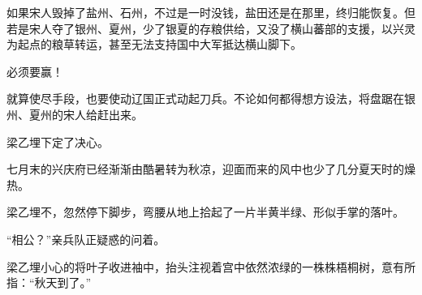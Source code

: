 如果宋人毁掉了盐州、石州，不过是一时没钱，盐田还是在那里，终归能恢复。但若是宋人夺了银州、夏州，少了银夏的存粮供给，又没了横山蕃部的支援，以兴灵为起点的粮草转运，甚至无法支持国中大军抵达横山脚下。

必须要赢！

就算使尽手段，也要使动辽国正式动起刀兵。不论如何都得想方设法，将盘踞在银州、夏州的宋人给赶出来。

梁乙埋下定了决心。

七月末的兴庆府已经渐渐由酷暑转为秋凉，迎面而来的风中也少了几分夏天时的燥热。

梁乙埋不，忽然停下脚步，弯腰从地上拾起了一片半黄半绿、形似手掌的落叶。

“相公？”亲兵队正疑惑的问着。

梁乙埋小心的将叶子收进袖中，抬头注视着宫中依然浓绿的一株株梧桐树，意有所指：“秋天到了。”

